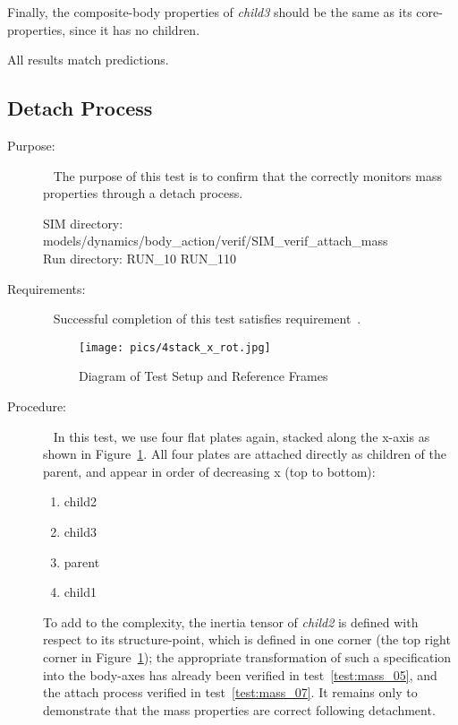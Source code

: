 \begin{description}
Finally, the composite-body properties of \textit{child3} should be the same
as its core-properties, since it has no children.

All results match predictions.

\end{description}

\clearpage






\subsection{Detach Process}
\label{test:mass_10}
\begin{description}
\item[Purpose:] \ \newline
The purpose of this test is to confirm that the \ModelDesc
correctly monitors mass properties through a detach process.

SIM directory: models/dynamics/body\_action/verif/SIM\_verif\_attach\_mass\\
Run directory: RUN\_10 RUN\_110

\item[Requirements:] \ \newline
Successful completion of this test satisfies
requirement~.

\begin{figure}[h]
\begin{center}
\texttt{[image: pics/4stack\_x\_rot.jpg]}
\caption{Diagram of Test Setup and Reference Frames}
\label{fig:4body_axis_2}
\end{center}
\end{figure}

\item[Procedure:]\ \newline
In this test, we use four flat plates again, stacked along the x-axis as shown
in Figure~\ref{fig:4body_axis_2}.  All four plates are attached directly as
children of the parent, and appear in order of decreasing x (top to bottom):
\begin{enumerate}
 \item child2
 \item child3
 \item parent
 \item child1
\end{enumerate}

To add to the complexity, the inertia tensor of \textit{child2} is defined
with respect to its structure-point, which is defined in one corner (the top
right corner in Figure~\ref{fig:4body_axis_2}); the appropriate transformation
of such a specification into the body-axes has already been verified in
test~\ref{test:mass_05}, and the attach process verified in
test~\ref{test:mass_07}.  It remains only to demonstrate that the mass
properties are correct following detachment.


\end{description}
